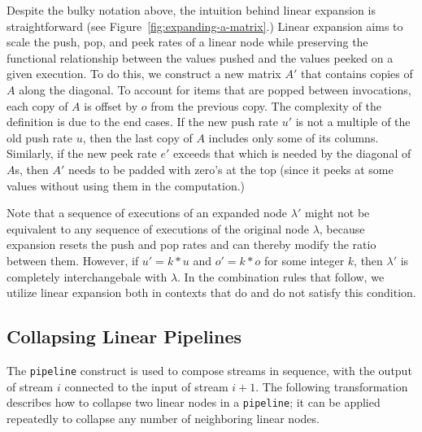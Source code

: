 Despite the bulky notation above, the intuition behind linear
expansion is straightforward (see
Figure~\ref{fig:expanding-a-matrix}.)  Linear expansion aims to scale
the push, pop, and peek rates of a linear node while preserving the
functional relationship between the values pushed and the values
peeked on a given execution.  To do this, we construct a new matrix
$A'$ that contains copies of $A$ along the diagonal.  To account for
items that are popped between invocations, each copy of $A$ is offset
by $o$ from the previous copy.  The complexity of the definition is
due to the end cases.  If the new push rate $u'$ is not a multiple of
the old push rate $u$, then the last copy of $A$ includes only some of
its columns.  Similarly, if the new peek rate $e'$ exceeds that which
is needed by the diagonal of $A$s, then $A'$ needs to be padded with
zero's at the top (since it peeks at some values without using them in
the computation.)

Note that a sequence of executions of an expanded node $\lambda'$
might not be equivalent to any sequence of executions of the original
node $\lambda$, because expansion resets the push and pop rates and
can thereby modify the ratio between them.  However, if $u' = k * u$
and $o' = k * o$ for some integer $k$, then $\lambda'$ is completely
interchangebale with $\lambda$.  In the combination rules that follow,
we utilize linear expansion both in contexts that do and do not
satisfy this condition.

\subsection{Collapsing Linear Pipelines}


The {\tt pipeline} construct is used to compose streams in sequence,
with the output of stream $i$ connected to the input of stream $i+1$.
The following transformation describes how to collapse two linear
nodes in a {\tt pipeline}; it can be applied repeatedly to collapse
any number of neighboring linear nodes.

